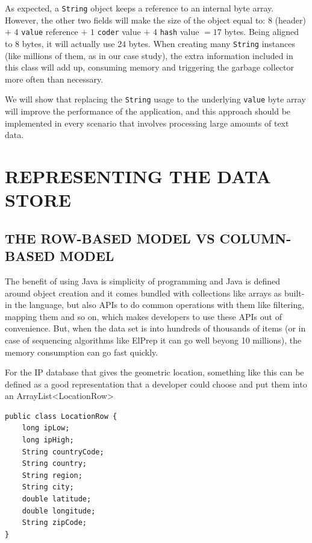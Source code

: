 \documentclass[a4paper,twoside]{article}
\begin{document}
As expected, a \texttt{String} object keeps a reference to an internal byte array.
However, the other two fields will make the size of the object equal to: $8$ (header) $+$ $4$ \texttt{value} reference $+$ $1$  \texttt{coder} value $+$ $4$ \texttt{hash} value $= 17$ bytes.
Being aligned to $8$ bytes, it will actually use $24$ bytes.
When creating many \texttt{String} instances (like millions of them, as in our case study), the extra information included in this class will add up, consuming memory and  triggering the garbage collector more often than necessary. 

We will show that replacing the \texttt{String} usage to the underlying \texttt{value} byte array will improve the performance of the application, and this approach should be implemented in every scenario that involves processing large amounts of text data.




\section{\uppercase{Representing the Data Store}}
\label{sec:model}

\subsection{\uppercase{The Row-Based Model vs Column-Based Model}}
\label{subsec:row}

The benefit of using Java is simplicity of programming and Java is defined around object creation and it comes bundled with collections like arrays as built-in the language, but also APIs to do common operations with them like filtering, mapping them and so on, which makes developers to use these APIs out of convenience.
But, when the data set is into hundreds of thousands of items (or in case of sequencing algorithms like ElPrep it can go well beyong 10 millions), the memory consumption can go fast quickly.

For the IP database that gives the geometric location, something like this can be defined as a good representation that a developer could choose and put them into an ArrayList<LocationRow>

\begin{small}
\begin{verbatim}
public class LocationRow {
	long ipLow;
	long ipHigh;
	String countryCode;
	String country;
	String region;
	String city;
	double latitude;
	double longitude;
	String zipCode;
}
\end{verbatim}
\end{small}
\end{document}
